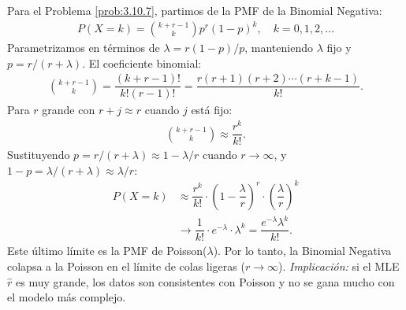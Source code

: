 \begin{solucion}
	\label{sol:3.10.7}
	Para el Problema \ref{prob:3.10.7}, partimos de la PMF de la Binomial Negativa:
	\begin{align*}
		P(X = k) = \binom{k + r - 1}{k} p^{r} (1-p)^{k}, \quad k = 0, 1, 2, \dots
	\end{align*}
	Parametrizamos en términos de $\lambda = r(1-p)/p$, manteniendo $\lambda$ fijo y $p = r/(r + \lambda)$. El coeficiente binomial:
	\begin{align*}
		\binom{k + r - 1}{k} = \dfrac{(k+r-1)!}{k! (r-1)!} = \dfrac{r(r+1)(r+2)\cdots(r+k-1)}{k!}.
		\end{align*}
	Para $r$ grande con $r + j \approx r$ cuando $j$ está fijo:
	\begin{align*}
		\binom{k + r - 1}{k} \approx \dfrac{r^{k}}{k!}.
	\end{align*}
	Sustituyendo $p = r/(r + \lambda) \approx 1 - \lambda/r$ cuando $r \to \infty$, y $1 - p = \lambda/(r + \lambda) \approx \lambda/r$:
	\begin{align*}
		P(X = k) &\approx \dfrac{r^{k}}{k!} \cdot \left(1 - \dfrac{\lambda}{r}\right)^{r} \cdot \left(\dfrac{\lambda}{r}\right)^{k} \\
		&\to \dfrac{1}{k!} \cdot e^{-\lambda} \cdot \lambda^{k} = \dfrac{e^{-\lambda}\lambda^{k}}{k!}.
	\end{align*}
	Este último límite es la PMF de Poisson($\lambda$). Por lo tanto, la Binomial Negativa colapsa a la Poisson en el límite de colas ligeras ($r \to \infty$). \emph{Implicación:} si el MLE $\hat{r}$ es muy grande, los datos son consistentes con Poisson y no se gana mucho con el modelo más complejo. \qedhere
\end{solucion}

